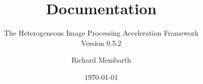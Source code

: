 


\title{\hipacc{} Documentation}
\subtitle{The Heterogeneous Image Processing Acceleration Framework\\Version 0.5.2}
\author{Richard Membarth}
\date{\today}

\maketitle

\cleardoublepage
\tableofcontents
\cleardoublepage






\nocite{membarth2011ggc}
\nocite{membarth2012gdg}
\nocite{membarth2012aoi}
\nocite{membarth2012msv}
\cleardoublepage
\appendix





